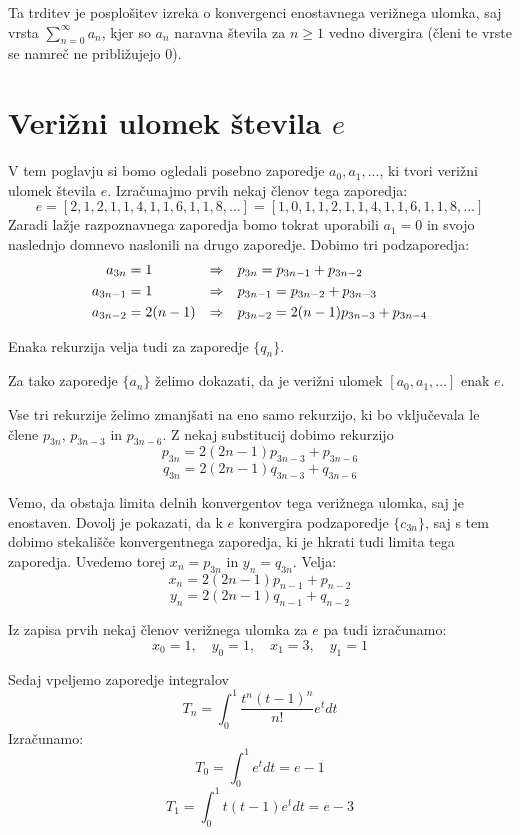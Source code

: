 \documentclass[a4paper,12pt]{article}
\theoremstyle{definition}
\theoremstyle{proposition}
\theoremstyle{theorem}
\theoremstyle{lemma}
\begin{document}
Ta trditev je posplošitev izreka o konvergenci enostavnega verižnega ulomka, saj vrsta $\sum_{n=0}^{\infty}a_n$, kjer so $a_n$ naravna števila za $n \geq 1$ vedno divergira (členi te vrste se namreč ne približujejo $0$).

\section{Verižni ulomek števila $e$} \label{euler}

V tem poglavju si bomo ogledali posebno zaporedje $a_0,a_1,...$, ki tvori verižni ulomek števila $e$. Izračunajmo prvih nekaj členov tega zaporedja:
\[e = [2, 1, 2, 1, 1, 4, 1, 1, 6, 1, 1, 8, ...] = [1, 0, 1, 1, 2, 1, 1, 4, 1, 1, 6, 1, 1, 8, ...] \]
Zaradi lažje razpoznavnega zaporedja bomo tokrat uporabili $a_1=0$ in svojo naslednjo domnevo naslonili na drugo zaporedje. Dobimo tri podzaporedja:
\begin{align*}
a_{3n} &= 1 &\Rightarrow \quad & p_{3n} = p_{3n-1}+p_{3n-2} \hfill \\
a_{3n-1} &= 1 &\Rightarrow \quad & p_{3n-1} = p_{3n-2}+p_{3n-3} \hfill \\
a_{3n-2} &= 2(n-1) &\Rightarrow \quad & p_{3n-2} = 2(n-1)p_{3n-3}+p_{3n-4} \hfill \\
\end{align*}

Enaka rekurzija velja tudi za zaporedje $\{q_n\}$.\par
Za tako zaporedje $\{a_n\}$ želimo dokazati, da je verižni ulomek $[a_0, a_1,...]$ enak $e$.\par Vse tri rekurzije želimo zmanjšati na eno samo rekurzijo, ki bo vključevala le člene $p_{3n}$, $p_{3n-3}$ in $p_{3n-6}$. Z nekaj substitucij dobimo rekurzijo
\[ p_{3n} = 2(2n-1)p_{3n-3}+p_{3n-6} \]
\[ q_{3n} = 2(2n-1)q_{3n-3}+q_{3n-6} \]

Vemo, da obstaja limita delnih konvergentov tega verižnega ulomka, saj je enostaven. Dovolj je pokazati, da k $e$ konvergira podzaporedje $\{c_{3n}\}$, saj s tem dobimo stekališče konvergentnega zaporedja, ki je hkrati tudi limita tega zaporedja. Uvedemo torej $x_n = p_{3n}$ in $y_n = q_{3n}$. Velja:
\[ x_n = 2(2n-1)p_{n-1}+p_{n-2} \]
\[ y_n = 2(2n-1)q_{n-1}+q_{n-2} \]

Iz zapisa prvih nekaj členov verižnega ulomka za $e$ pa tudi izračunamo:
\[ x_0 = 1,\quad y_0=1,\quad x_1=3,\quad y_1=1\]

Sedaj vpeljemo zaporedje integralov $$T_n = \int_{0}^{1}\frac{t^n(t-1)^n}{n!}e^t dt$$
Izračunamo:
$$T_0 = \int_{0}^{1}e^t dt = e -1$$
$$T_1 = \int_{0}^{1}t(t-1)e^t dt=e-3$$
\end{document}
